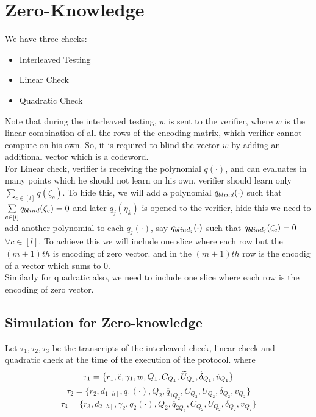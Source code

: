 \section{Zero-Knowledge}
We have three checks:
\begin{itemize}
	\item Interleaved Testing
	\item Linear Check
	\item Quadratic Check
\end{itemize}
Note that during the interleaved testing, $w$ is sent to the verifier, where $w$ is the linear combination of all the rows of the encoding matrix, which verifier cannot compute on his own. So, it is required to blind the vector $w$ by adding an additional vector which is a codeword.\\

For Linear check, verifier is receiving the polynomial $q(\cdot)$, and can evaluates in many points which he should not learn on his own, verifier should learn only $\sum\limits_{c\in[l]}q(\zeta_c)$. To hide this, we will add a polynomial $q_{blind}(\cdot)$ such that $\sum\limits_{c\in[l]}q_{blind}(\zeta_c)=0$ and later $q_j(\eta_k)$ is opened to the verifier, hide this we need to add another polynomial to each $q_j(\cdot)$, say $q_{{blind}_j}(\cdot)$ such that $q_{{blind}_j}(\zeta_c)=0$ $\forall c\in [l]$. To achieve this we will include one slice where each row but the $(m+1)th$ is encoding of zero vector. and in the $(m+1)th$ row is the encodig of a vector which sums to 0.\\

Similarly for quadratic also, we need to include one slice where each row  is the encoding of zero vector.

\subsection{Simulation for Zero-knowledge} Let $\tau_1, \tau_2, \tau_3$ be the transcripts of the interleaved check, linear check and quadratic check at the time of the execution of the protocol. where 
$$\tau_1=\{r_1,\tilde{c}, \gamma_1, w, Q_1, C_{Q_1}, \widetilde{U}_{Q_1}, \tilde{\delta}_{Q_1}, \tilde{v}_{Q_1}\}$$
$$\tau_2= \{r_2, d_{1[h]}, q_1(\cdot), Q_2, \overline{q}_{1Q_2}, C_{Q_2}, U_{Q_2}, \delta_{Q_2}, v_{Q_2} \}$$
$$\tau_3= \{r_3, d_{2[h]}, \gamma_2, q_2(\cdot), Q_2, \overline{q}_{2Q_2}, C_{Q_2}, U_{Q_2}, \delta_{Q_2}, v_{Q_2} \}$$

